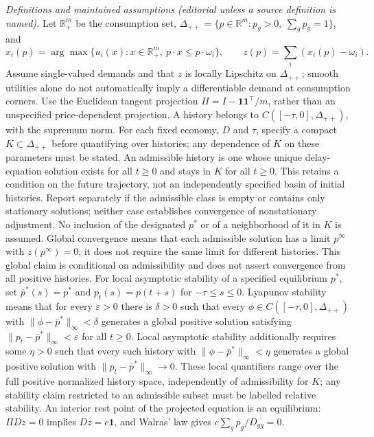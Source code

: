 \documentclass[11pt,a4paper]{article}
\begin{document}
\emph{Definitions and maintained assumptions (editorial unless a source definition is named).} Let \(\mathbb R_+^m\) be the consumption set, \(\Delta_{++}=\{p\in\mathbb R^m:p_g>0,\ \sum_g p_g=1\}\), and
\[x_i(p)=\arg\max\{u_i(x):x\in\mathbb R_+^m,\ p\cdot x\le p\cdot\omega_i\},\qquad z(p)=\sum_i(x_i(p)-\omega_i).\]
Assume single-valued demands and that \(z\) is locally Lipschitz on \(\Delta_{++}\); smooth utilities alone do not automatically imply a differentiable demand at consumption corners. Use the Euclidean tangent projection \(\Pi=I-\mathbf1\mathbf1^\top/m\), rather than an unspecified price-dependent projection. A history belongs to \(C([-\tau,0],\Delta_{++})\), with the supremum norm. For each fixed economy, \(D\) and \(\tau\), specify a compact \(K\subset\Delta_{++}\) before quantifying over histories; any dependence of \(K\) on these parameters must be stated. An admissible history is one whose unique delay-equation solution exists for all \(t\ge0\) and stays in \(K\) for all \(t\ge0\). This retains a condition on the future trajectory, not an independently specified basin of initial histories. Report separately if the admissible class is empty or contains only stationary solutions; neither case establishes convergence of nonstationary adjustment. No inclusion of the designated \(p^*\) or of a neighborhood of it in \(K\) is assumed. Global convergence means that each admissible solution has a limit \(p^\infty\) with \(z(p^\infty)=0\); it does not require the same limit for different histories. This global claim is conditional on admissibility and does not assert convergence from all positive histories. For local asymptotic stability of a specified equilibrium \(p^*\), set \(\bar p^*(s)=p^*\) and \(p_t(s)=p(t+s)\) for \(-\tau\leq s\leq0\). Lyapunov stability means that for every \(\varepsilon>0\) there is \(\delta>0\) such that every \(\phi\in C([-\tau,0],\Delta_{++})\) with \(\|\phi-\bar p^*\|_\infty<\delta\) generates a global positive solution satisfying \(\|p_t-\bar p^*\|_\infty<\varepsilon\) for all \(t\geq0\). Local asymptotic stability additionally requires some \(\eta>0\) such that every such history with \(\|\phi-\bar p^*\|_\infty<\eta\) generates a global positive solution with \(\|p_t-\bar p^*\|_\infty\to0\). These local quantifiers range over the full positive normalized history space, independently of admissibility for \(K\); any stability claim restricted to an admissible subset must be labelled relative stability. An interior rest point of the projected equation is an equilibrium: \(\Pi Dz=0\) implies \(Dz=c\mathbf1\), and Walras' law gives \(c\sum_g p_g/D_{gg}=0\).
\end{document}
